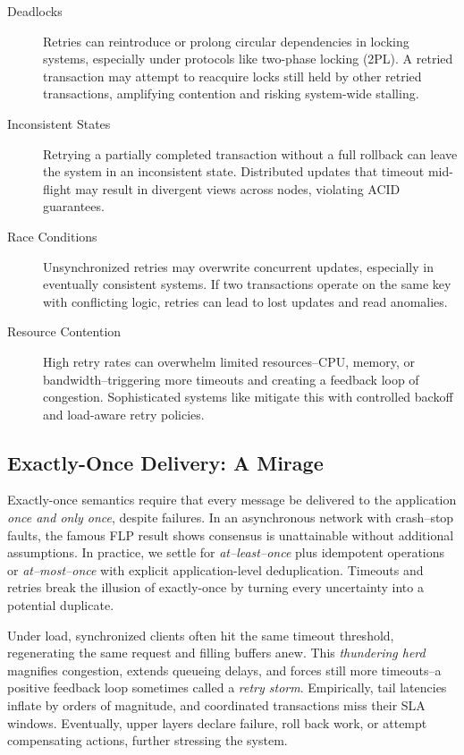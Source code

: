 \documentclass[../OAE-SPEC-MAIN.tex]{subfiles}
\begin{document}
\begin{description}

  \item[Deadlocks]  
  Retries can reintroduce or prolong circular dependencies in locking systems, especially under protocols like two-phase locking (2PL). A retried transaction may attempt to reacquire locks still held by other retried transactions, amplifying contention and risking system-wide stalling.

  \item[Inconsistent States]  
  Retrying a partially completed transaction without a full rollback can leave the system in an inconsistent state. Distributed updates that timeout mid-flight may result in divergent views across nodes, violating ACID guarantees.

  \item[Race Conditions]  
  Unsynchronized retries may overwrite concurrent updates, especially in eventually consistent systems. If two transactions operate on the same key with conflicting logic, retries can lead to lost updates and read anomalies.

  \item[Resource Contention]  
  High retry rates can overwhelm limited resources--CPU, memory, or bandwidth--triggering more timeouts and creating a feedback loop of congestion. Sophisticated systems like \textcite{GoogleSpanner2012} mitigate this with controlled backoff and load-aware retry policies.

\end{description}


\subsection*{Exactly-Once Delivery: A Mirage}

Exactly-once semantics require that every message be delivered to the application \emph{once and only once}, despite failures.  In an asynchronous network with crash--stop faults, the famous FLP result shows consensus is unattainable without additional assumptions.  In practice, we settle for \emph{at--least--once} plus idempotent operations or \emph{at--most--once} with explicit application-level deduplication.  Timeouts and retries break the illusion of exactly-once by turning every uncertainty into a potential duplicate.

Under load, synchronized clients often hit the same timeout threshold, regenerating the same request and filling buffers anew.  This \emph{thundering herd} magnifies congestion, extends queueing delays, and forces still more timeouts--a positive feedback loop sometimes called a \emph{retry storm}.  Empirically, tail latencies inflate by orders of magnitude, and coordinated transactions miss their SLA windows. Eventually, upper layers declare failure, roll back work, or attempt compensating actions, further stressing the system.
\end{document}
